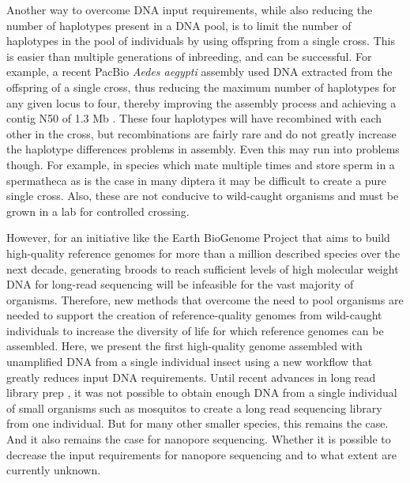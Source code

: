 \par{
Another way to overcome DNA input requirements, while also reducing the number of haplotypes present in a DNA pool, is to limit the number of haplotypes in the pool of individuals by using offspring from a single cross. This is easier than multiple generations of inbreeding, and can be successful. For example, a recent PacBio \textit{Aedes aegypti} assembly used DNA extracted from the offspring of a single cross, thus reducing the maximum number of haplotypes for any given locus to four, thereby improving the assembly process and achieving a contig N50 of 1.3 Mb \cite{Matthews2018-th}. These four haplotypes will have recombined with each other in the cross, but recombinations are fairly rare and do not greatly increase the haplotype differences problems in assembly. Even this may run into problems though. For example, in species which mate multiple times and store sperm in a spermatheca as is the case in many diptera\cite{spermatheca}\cite{polyandry} it may be difficult to create a pure single cross. Also, these are not conducive to wild-caught organisms and must be grown in a lab for controlled crossing.
}

\par{
However, for an initiative like the Earth BioGenome Project \cite{Lewin2018-lc} that aims to build high-quality reference genomes for more than a million described species over the next decade, generating broods to reach sufficient levels of high molecular weight DNA for long-read sequencing will be infeasible for the vast majority of organisms. Therefore, new methods that overcome the need to pool organisms are needed to support the creation of reference-quality genomes from wild-caught individuals to increase the diversity of life for which reference genomes can be assembled. Here, we present the first high-quality genome assembled with unamplified DNA from a single individual insect using a new workflow that greatly reduces input DNA requirements. Until recent advances in long read library prep \cite{mosquito_assembly}, it was not possible to obtain
enough DNA from a single individual of small organisms such as mosquitos to create a long read sequencing library from one individual. 
But for many other smaller species, this remains the case. And it also remains the case for nanopore sequencing. 
Whether it is possible to decrease the input requirements for nanopore sequencing and to what extent are currently unknown.  
}

